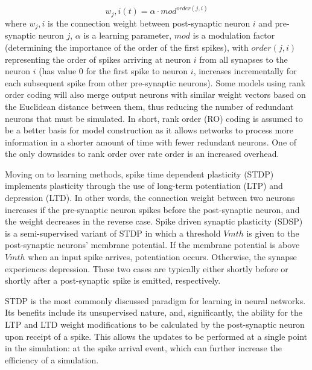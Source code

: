 \documentclass[journal]{./sty/IEEEtran}
\begin{document}
\begin{equation}
w_j,i(t) = {\alpha}\cdot{mod^{order(j,i)}} 
\end{equation} 
where $w_j,i$ is the connection weight between post-synaptic neuron $i$ and pre-synaptic neuron $j$, $\alpha$ is a learning parameter, $mod$ is a modulation factor (determining the importance of the order of the first spikes), with $order(j,i)$ representing the order of spikes arriving at neuron $i$ from all synapses to the neuron $i$ (has value $0$ for the first spike to neuron $i$, increases incrementally for each subsequent spike from other pre-synaptic neurons). \cite{deSNN:Kasabov}
Some models using rank order coding will also merge output neurons with similar weight vectors based on the Euclidean distance between them, thus reducing the number of redundant neurons that must be simulated.
In short, rank order (RO) coding is assumed to be a better basis for model construction as it allows networks to process more information in a shorter amount of time with fewer redundant neurons. 
One of the only downsides to rank order over rate order is an increased overhead.

Moving on to learning methods, spike time dependent plasticity (STDP) implements plasticity 
through the use of long-term potentiation (LTP) and depression (LTD). 
In other words, the connection weight between two neurons increases 
if the pre-synaptic neuron spikes before the post-synaptic neuron, 
and the weight decreases in the reverse case.  
Spike driven synaptic plasticity (SDSP) is a semi-supervised variant of STDP 
in which a threshold $Vmth$ is given to the post-synaptic neurons' membrane potential. 
If the membrane potential is above $Vmth$ when an input spike arrives, potentiation occurs. 
Otherwise, the synapse experiences depression.
These two cases are typically either shortly before or shortly after a post-synaptic 
spike is emitted, respectively. 

STDP is the most commonly discussed paradigm for learning in neural networks. Its benefits include its unsupervised nature, and, significantly, the ability for the LTP and LTD weight modifications to be calculated by the post-synaptic neuron upon receipt of a spike. This allows the updates to be performed at a single point in the simulation: at the spike arrival event, which can further increase the efficiency of a simulation. \cite{FBBPSTDP:Davies,FBSTDP:Davies}
\end{document}
